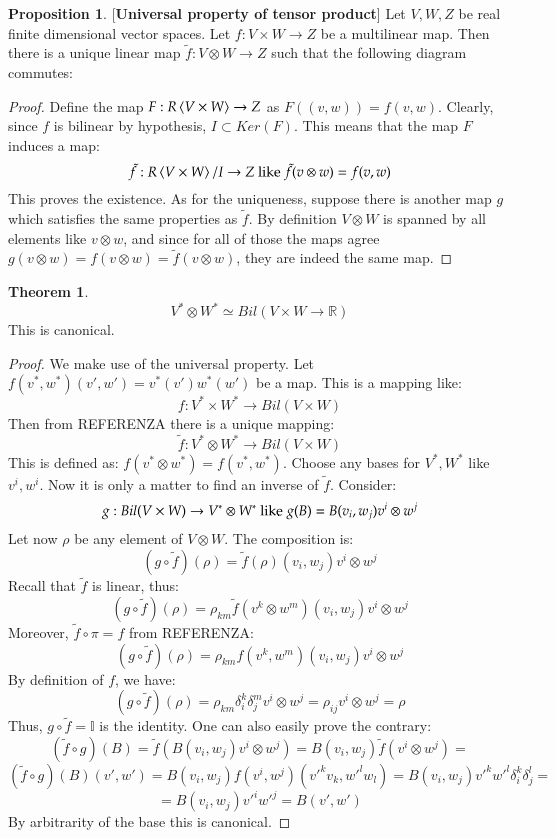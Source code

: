 \documentclass[12pt,a4paper]{report}
\theoremstyle{definition}
\theoremstyle{Theorem}
\newtheorem{Theo}[Def]{Theorem}
\newtheorem{Prop}[Def]{Proposition}
\theoremstyle{break}
\theoremstyle{definition}
\begin{document}
	\begin{Prop}\label{prop_1.1.1}[\textbf{Universal property of tensor product}]
		Let $V,W,Z$ be real finite dimensional vector spaces. Let $f:V\times W\rightarrow Z$ be a multilinear map. Then there is a unique linear map $\tilde{f}:V\otimes W\rightarrow Z$ such that the following diagram commutes:
		\\
		\begin{center}
		\end{center}
	\end{Prop}
	\begin{proof}
		Define the map $F:R\braket{V\times W}\rightarrow Z$ as $F((v,w))=f(v,w)$. Clearly, since $f$ is bilinear by hypothesis, $I\subset Ker(F)$. This means that the map $F$ induces a map:
		$$\tilde{f}:R\braket{V\times W}/I\rightarrow Z\hbox{ like }\tilde{f}(v\otimes w)=f(v,w)$$
		This proves the existence. As for the uniqueness, suppose there is another map $g$ which satisfies the same properties as $\tilde{f}$. By definition $V\otimes W$ is spanned by all elements like $v\otimes w$, and since for all of those the maps agree $g(v\otimes w)=f(v\otimes w)=\tilde{f}(v\otimes w)$, they are indeed the same map. 
	\end{proof}
	\begin{Theo}\label{theo_1.1.1}
		$$V^*\otimes W^*\simeq Bil(V\times W\rightarrow \mathbb{R})$$
		This is canonical.
	\end{Theo}
	\begin{proof}
		We make use of the universal property. Let $f(v^*,w^*)(v',w')=v^*(v')w^*(w')$ be a map. This is a mapping like:
		$$f:V^*\times W^*\rightarrow Bil(V\times W)$$ 
		Then from REFERENZA there is a unique mapping:
		$$\tilde{f}:V^*\otimes W^*\rightarrow Bil(V\times W)$$
		This is defined as: $f(v^*\otimes w^*)=f(v^*,w^*)$. Choose any bases for $V^*,W^*$ like $v^i,w^i$. Now it is only a matter to find an inverse of $\tilde{f}$. Consider:
		$$g:Bil(V\times W)\rightarrow V^*\otimes W^*\hbox{ like }g(B)=B(v_i,w_j)v^i\otimes w^j$$
		Let now $\rho$ be any element of $V\otimes W$. The composition is:
		$$(g\circ \tilde{f})(\rho)=\tilde{f}(\rho)(v_i,w_j)v^i\otimes w^j$$
		Recall that $\tilde{f}$ is linear, thus:
		$$(g\circ \tilde{f})(\rho)=\rho_{km}\tilde{f}(v^k\otimes w^m)(v_i,w_j)v^i\otimes w^j$$
		Moreover, $\tilde{f}\circ \pi=f$ from REFERENZA:
		$$(g\circ \tilde{f})(\rho)=\rho_{km}f(v^k,w^m)(v_i,w_j)v^i\otimes w^j$$
		By definition of $f$, we have:
		$$(g\circ \tilde{f})(\rho)=\rho_{km}\delta^k_i\delta^m_jv^i\otimes w^j=\rho_{ij}v^i\otimes w^j=\rho$$
		Thus, $g\circ \tilde{f}=\mathbb{I}$ is the identity. One can also easily prove the contrary:
		$$(\tilde{f}\circ g)(B)=\tilde{f}(B(v_i,w_j)v^i\otimes w^j)=B(v_i,w_j)\tilde{f}(v^i\otimes w^j)=$$
		$$(\tilde{f}\circ g)(B)(v',w')=B(v_i,w_j)f(v^i,w^j)(v'^kv_k,w'^lw_l)=B(v_i,w_j)v'^kw'^l\delta_i^k\delta_j^l=$$$$=B(v_i,w_j)v'^iw'^j=B(v',w')$$
		By arbitrarity of the base this is canonical.
	\end{proof}
\end{document}
